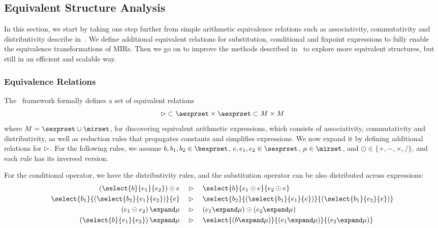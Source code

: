 \subsection{Equivalent Structure Analysis}
\label{sub:equivalence_analysis}

In this section, we start by taking one step further from simple arithmetic
equivalence relations such as associativity, commutativity and distributivity
describe in~\cite{soap}.  We define additional equivalent relations for
substitution, conditional and fixpoint expressions to fully enable the
equivalence transformations of MIRs.  Then we go on to improve the methods
described in \soap~to explore more equivalent structures, but still in an
efficient and scalable way.

\subsubsection{Equivalence Relations}

The \soap~framework formally defines a set of equivalent relations
\begin{equation}
    \eqrel \subset \aexprset \times \aexprset \subset M \times M
\end{equation}
where $M = \sexprset \cup \mirset$, for discovering equivalent arithmetic
expressions, which consists of associativity, commutativity and distributivity,
as well as reduction rules that propagates constants and simplifies
expressions.  We now expand it by defining additional relations for $\mathbin{\rhd}$.
For the following rules, we assume $b, b_1, b_2 \in \bexprset$, $e, e_1, e_2
\in \sexprset$, $\mu \in \mirset$, and $\odot \in \{+, -, \times, /\}$, and
each rule has its inversed version.

For the conditional operator, we have the distributivity rules, and the
substitution operator can be also distributed across expressions:
\begin{equation}
    \begin{aligned}
        \left(\select{b}{e_1}{e_2}\right) \odot e
        & \quad \eqrel \quad
        \select{b}{e_1 \odot e}{e_2 \odot e} \\
        \select{b_1}{\left(\select{b_2}{e_1}{e_2}\right)}{e}
        & \quad \eqrel \quad
        \select{b_2}{%
            \left(\select{b_1}{e_1}{e}\right)}{%
            \left(\select{b_1}{e_2}{e}\right)} \\
        \left( e_1 \odot e_2 \right) \expand \mu
        & \quad \eqrel \quad
        \left( e_1 \expand \mu \right) \odot \left( e_2 \expand \mu \right) \\
        \left( \select{b}{e_1}{e_2} \right) \expand \mu
        & \quad \eqrel \quad
        \select{%
            \left( b \expand \mu \right)}{%
            \left( e_1 \expand \mu \right)}{%
            \left( e_2 \expand \mu \right)}
    \end{aligned}
\end{equation}

